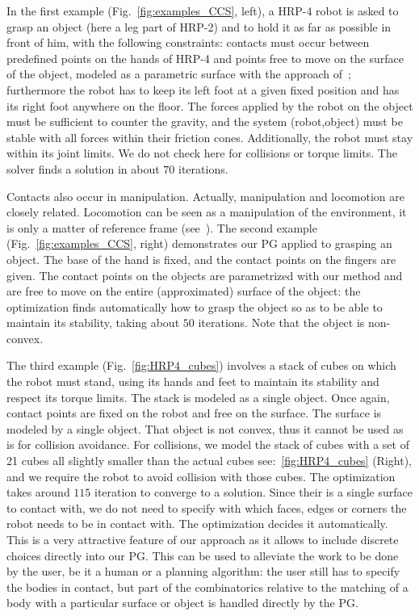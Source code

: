 In the first example (Fig.~\ref{fig:examples_CCS}, left), a HRP-4 robot is asked to grasp an object (here a leg part of HRP-2) and to hold it as far as possible in front of him, with the following constraints: contacts must occur between predefined points on the hands of HRP-4 and points free to move on the surface of the object, modeled as a parametric surface with the approach of~\cite{escande:icra:2016}; furthermore the robot has to keep its left foot at a given fixed position and has its right foot anywhere on the floor.
The forces applied by the robot on the object must be sufficient to counter the gravity, and the system (robot,object) must be stable with all forces within their friction cones.
Additionally, the robot must stay within its joint limits.
We do not check here for collisions or torque limits.
The solver finds a solution in about $70$ iterations.

Contacts also occur in manipulation.
Actually, manipulation and locomotion are closely related.
Locomotion can be seen as a manipulation of the environment, it is only a matter of reference frame (see~\cite{bouyarmane:ar:2012}).
The second example (Fig.~\ref{fig:examples_CCS}, right) demonstrates our PG applied to grasping an object.
The base of the hand is fixed, and the contact points on the fingers are given.
The contact points on the objects are parametrized with our method and are free to move on the entire (approximated) surface of the object: the optimization finds automatically how to grasp the object so as to be able to maintain its stability, taking about $50$ iterations.
Note that the object is non-convex.

The third example (Fig.~\ref{fig:HRP4_cubes}) involves a stack of cubes on which the robot must stand, using its hands and feet to maintain its stability and respect its torque limits.
The stack is modeled as a single object.
Once again, contact points are fixed on the robot and free on the surface.
The surface is modeled by a single object. That object is not convex, thus it cannot be used as is for collision avoidance.
For collisions, we model the stack of cubes with a set of 21 cubes all slightly smaller than the actual cubes see:~\ref{fig:HRP4_cubes} (Right), and we require the robot to avoid collision with those cubes.
The optimization takes around $115$ iteration to converge to a solution.
Since their is a single surface to contact with, we do not need to specify with which faces, edges or corners the robot needs to be in contact with.
The optimization decides it automatically.
This is a very attractive feature of our approach as it allows to include discrete choices directly into our PG\@.
This can be used to alleviate the work to be done by the user, be it a human or a planning algorithm: the user still has to specify the bodies in contact, but part of the combinatorics relative to the matching of a body with a particular surface or object is handled directly by the PG\@.


